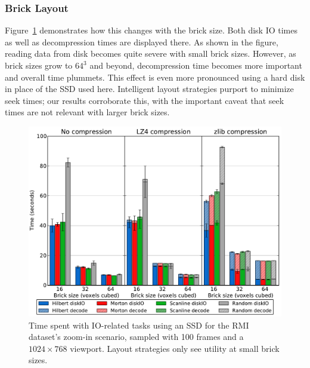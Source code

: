 \subsubsection{Brick Layout}

Figure~\ref{fig:layout} demonstrates how this changes with the brick
size.  Both disk IO times as well as decompression times are displayed
there.  As shown in the figure, reading data from disk becomes quite
severe with small brick sizes.  However, as brick sizes grow to $64^3$
and beyond, decompression time becomes more important and overall time
plummets.  This effect is even more pronounced using a hard disk in
place of the SSD used here.  Intelligent layout strategies purport to
minimize seek times; our results corroborate this, with the important
caveat that seek times are not relevant with larger brick sizes.

\begin{figure}[tb]
  \centering
  \includegraphics[width=1.00\linewidth]{images/rg/brickIO-RichtmyerMeshkov-ZoomIn-SSD.pdf}

  \caption{Time spent with IO-related tasks using an SSD for the
  RMI dataset's zoom-in scenario, sampled with 100 frames and a
  $1024\times768$ viewport.  Layout strategies only see utility at
  small brick sizes.}

  \label{fig:layout}
\end{figure}


